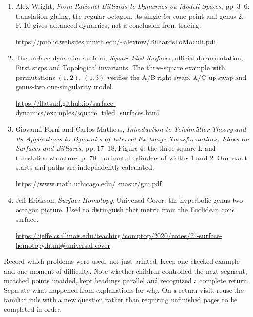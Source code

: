 \begin{enumerate}[label=\textbf{S\arabic*.},leftmargin=25pt]
\item Alex Wright, \emph{From Rational Billiards to Dynamics on Moduli Spaces}, pp. 3--6: translation gluing, the regular octagon, its single \(6\pi\) cone point and genus 2. P. 10 gives advanced dynamics, not a conclusion from tracing.\par
\url{https://public.websites.umich.edu/~alexmw/BilliardsToModuli.pdf}
\item The surface-dynamics authors, \emph{Square-tiled Surfaces}, official documentation, First steps and Topological invariants. The three-square example with permutations \((1,2)\), \((1,3)\) verifies the A/B right swap, A/C up swap and genus-two one-singularity model.\par
\url{https://flatsurf.github.io/surface-dynamics/examples/square_tiled_surfaces.html}
\item Giovanni Forni and Carlos Matheus, \emph{Introduction to Teichm\"uller Theory and Its Applications to Dynamics of Interval Exchange Transformations, Flows on Surfaces and Billiards}, pp. 17--18, Figure 4: the three-square L and translation structure; p. 78: horizontal cylinders of widths 1 and 2. Our exact starts and paths are independently calculated.\par
\url{https://www.math.uchicago.edu/~masur/gm.pdf}
\item Jeff Erickson, \emph{Surface Homotopy}, Universal Cover: the hyperbolic genus-two octagon picture. Used to distinguish that metric from the Euclidean cone surface.\par
\url{https://jeffe.cs.illinois.edu/teaching/comptop/2020/notes/21-surface-homotopy.html#universal-cover}
\end{enumerate}
Record which problems were used, not just printed. Keep one checked example and one moment of difficulty. Note whether children controlled the next segment, matched points unaided, kept headings parallel and recognized a complete return. Separate what happened from explanations for why. On a return visit, reuse the familiar rule with a new question rather than requiring unfinished pages to be completed in order.
